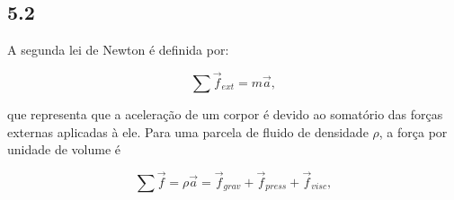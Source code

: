 \begin{figure}[ht!]
	\vspace{0mm}	%
	\vspace{-2mm}	%
	\label{ex4_fig1}
\end{figure}


\clearpage
\subsection*{5.2}
%

A segunda lei de Newton é definida por:

\begin{equation*}
\sum\vec{f}_{ext} = m \vec{a},
\end{equation*}

que representa que a aceleração de um corpor é devido ao somatório das forças externas aplicadas à ele. Para uma parcela de fluido de densidade $\rho$, a força por unidade de volume é

\begin{equation*}
\sum\vec{f} = \rho \vec{a} = \vec{f}_{grav} + \vec{f}_{press} + \vec{f}_{visc},
\end{equation*}

